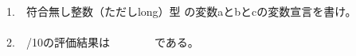 \documentclass[a4j]{jarticle}
\begin{document}
\begin{multicols*}{2}
1.　符合無し整数（ただしlong）型
の変数{\ttfamily aとbとc}の変数宣言を書け。\\
\\


2.　{/10}の評価結果は　　　　である。




%
%














\end{multicols*}
\end{document}
